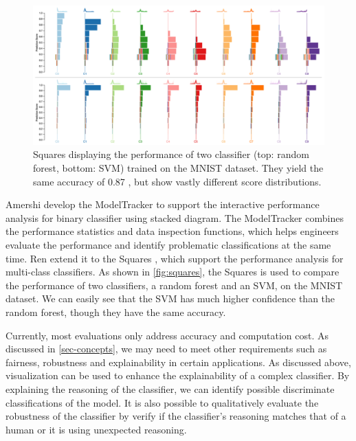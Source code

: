 \begin{figure}[bt]
    \centering
    \includegraphics[width=1.0\textwidth]{figure/squares}
    \caption{Squares \cite{ren2017squares} displaying the performance of two classifier (top: random forest, bottom: SVM) trained on the MNIST dataset. They yield the same accuracy of 0.87 , but show vastly different score distributions.}
    \label{fig:squares}
\end{figure}

Amershi \etal \cite{amershi2015modeltracker} develop the ModelTracker to support the interactive performance analysis for binary classifier using stacked diagram. The ModelTracker combines the performance statistics and data inspection functions, which helps engineers evaluate the performance and identify problematic classifications at the same time.
Ren \etal extend it to the Squares \cite{ren2017squares}, which support the performance analysis for multi-class classifiers. As shown in \autoref{fig:squares}, the Squares is used to compare the performance of two classifiers, a random forest and an SVM, on the MNIST dataset. We can easily see that the SVM has much higher confidence than the random forest, though they have the same accuracy.


Currently, most evaluations only address accuracy and computation cost. As discussed in \autoref{sec-concepts}, we may need to meet other requirements such as fairness, robustness and explainability in certain applications. 
As discussed above, visualization can be used to enhance the explainability of a complex classifier. By explaining the reasoning of the classifier, we can identify possible discriminate classifications of the model. It is also possible to qualitatively evaluate the robustness of the classifier by verify if the classifier's reasoning matches that of a human or it is using unexpected reasoning. 

